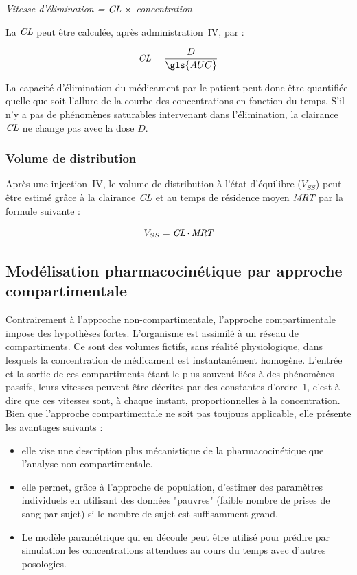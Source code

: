 \begin{center}
\textit{Vitesse d'élimination = $\operatorname{\textit{CL}} \, \times$ concentration}
\end{center}

La $\operatorname{\textit{CL}}$ peut être calculée, après administration~IV, par :

\begin{equation}
\CL = \frac{D}{\gls{AUC}}
\label{eq:11}
\end{equation}

La capacité d'élimination du médicament par le patient peut donc être quantifiée quelle que soit l'allure de la courbe des concentrations en fonction du temps. S'il n'y a pas de phénomènes saturables intervenant dans l'élimination, la clairance $\operatorname{\textit{CL}}$ ne change pas avec la dose $D$.

\subsubsection{Volume de distribution}
Après une injection~IV, le volume de distribution à l'état d'équilibre ($V_{SS}$) peut être estimé grâce à la clairance $\operatorname{\textit{CL}}$ et au temps de résidence moyen $\operatorname{\textit{MRT}}$ par la formule suivante :

\begin{equation}
V_{SS} = \operatorname{\textit{CL}} \cdot \operatorname{\textit{MRT}}
\label{eq:12}
\end{equation}

\subsection{Modélisation pharmacocinétique par approche compartimentale}
Contrairement à l'approche non-compartimentale, l'approche compartimentale impose des hypothèses fortes. L'organisme est assimilé à un réseau de compartiments. Ce sont des volumes fictifs, sans réalité physiologique, dans lesquels la concentration de médicament est instantanément homogène. L'entrée et la sortie de ces compartiments étant le plus souvent liées à des phénomènes passifs, leurs vitesses peuvent être décrites par des constantes d'ordre~1, c'est-à-dire que ces vitesses sont, à chaque instant, proportionnelles à la concentration. Bien que l'approche compartimentale ne soit pas toujours applicable, elle présente les avantages suivants :
\begin{itemize}
\item elle vise une description plus mécanistique de la pharmacocinétique que l'analyse non-compartimentale.

\item elle permet, grâce à l'approche de population, d'estimer des paramètres individuels en utilisant des données "pauvres" (faible nombre de prises de sang par sujet) si le nombre de sujet est suffisamment grand.

\item Le modèle paramétrique qui en découle peut être utilisé pour prédire par simulation les concentrations attendues au cours du temps avec d'autres posologies.
\end{itemize}

